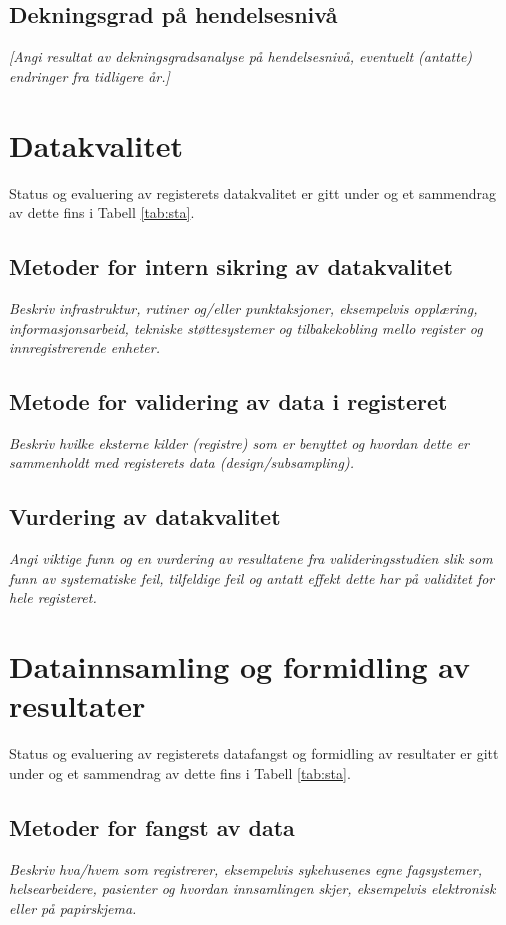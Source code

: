 \documentclass[norsk, a4paper, twocolumn]{report}
\newcommand{\guide}[1] {
	\textit{[\textcolor{guidegray}{#1}]}
	}
\begin{document}
\section{Dekningsgrad på hendelsesnivå}\label{sec:ind}
\guide{Angi resultat av dekningsgradsanalyse på hendelsesnivå,
eventuelt (antatte) endringer fra tidligere år.}


\chapter{Datakvalitet}\label{cha:kva}
Status og evaluering av registerets  datakvalitet er gitt under og et sammendrag
av dette fins i Tabell \ref{tab:sta}.

\section{Metoder for intern sikring av datakvalitet}\label{sec:sik}
\textit{Beskriv infrastruktur, rutiner og/eller punktaksjoner, eksempelvis
opplæring, informasjonsarbeid, tekniske støttesystemer og tilbakekobling mello
register og innregistrerende enheter.}

\section{Metode for validering av data i registeret}\label{sec:metval}
\textit{Beskriv hvilke eksterne kilder (registre) som er benyttet og hvordan
dette er sammenholdt med registerets data (design/subsampling).} 

\section{Vurdering av datakvalitet}\label{sec:valdat}
\textit{Angi viktige funn og en vurdering av resultatene fra
valideringsstudien slik som funn av systematiske feil, tilfeldige feil og
antatt effekt dette har på validitet for hele registeret.}



\chapter{Datainnsamling og formidling av resultater}\label{cha:dat}
Status og evaluering av registerets  datafangst og formidling av resultater
er gitt under og et sammendrag av dette fins i Tabell \ref{tab:sta}.

\section{Metoder for fangst av data}\label{sec:metfan}
\textit{Beskriv hva/hvem som registrerer, eksempelvis sykehusenes egne
fagsystemer, helsearbeidere, pasienter og hvordan innsamlingen skjer,
eksempelvis elektronisk eller på papirskjema.}
\end{document}
